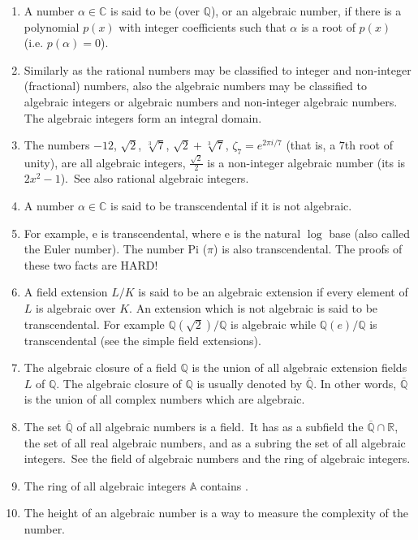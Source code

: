 \documentclass[12pt]{article}
\theoremstyle{definition}
\newcommand{\Reals}{\mathbb{R}}
\newcommand{\Complex}{\mathbb{C}}
\newcommand{\Rats}{\mathbb{Q}}
\begin{document}
\begin{enumerate}
\item A number $\alpha\in \Complex$ is said to be  (over $\Rats$), or an algebraic number, if there is a polynomial $p(x)$ with integer coefficients such that $\alpha$ is a root of $p(x)$ (i.e. $p(\alpha)=0$). 

\item Similarly as the rational numbers may be classified to integer and non-integer (fractional) numbers, also the algebraic numbers may be classified to algebraic integers or  algebraic numbers and non-integer algebraic numbers. \,The algebraic integers form an integral domain.

\item The numbers $-12$, $\sqrt{2}$, $\sqrt[3]{7}$, $\sqrt{2}+\sqrt[3]{7}$, $\zeta_{7}=e^{2\pi i/7}$ (that is, a $7$th root of unity), are all algebraic integers, $\frac{\sqrt{2}}{2}$ is a non-integer algebraic number (its  is $2x^2-1$).\, See also rational algebraic integers.

\item A number $\alpha\in \Complex$ is said to be transcendental if it is not algebraic.

\item For example, e is transcendental, where e is the natural $\log$ base (also called the Euler number). The number Pi ($\pi$) is also transcendental. The proofs of these two facts are HARD!

\item A field extension $L/K$ is said to be an algebraic extension if every element of $L$ is algebraic over $K$. An extension which is not algebraic is said to be transcendental. For example $\Rats(\sqrt{2})/\Rats$ is algebraic while $\Rats(e)/\Rats$ is transcendental (see the simple field extensions).

\item The algebraic closure of a field $\Rats$ is the union of all algebraic extension fields $L$ of $\Rats$. The algebraic closure of $\Rats$ is usually denoted by $\overline{\Rats}$. In other words, $\overline{\Rats}$ is the union of all complex numbers which are algebraic.

\item The set $\overline{\Rats}$ of all algebraic numbers is a field. \,It has as a subfield the $\overline{\Rats}\cap\Reals$, the set of all real algebraic numbers, and as a subring the set of all algebraic integers.\, See the field of algebraic numbers and the ring of algebraic integers.

\item The ring of all algebraic integers $\mathbb{A}$ contains . 

\item The height of an algebraic number is a way to measure the complexity of the number.

\end{enumerate}
\end{document}
